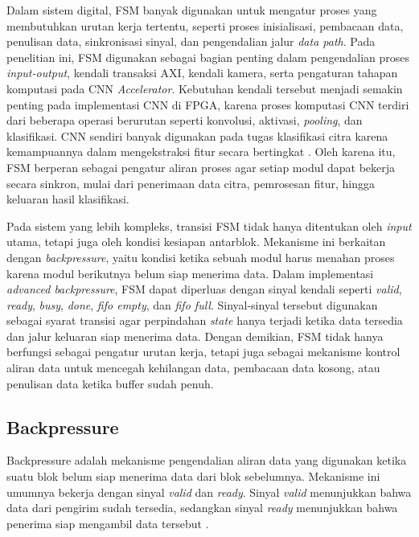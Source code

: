   Dalam sistem digital, FSM banyak digunakan untuk mengatur proses yang membutuhkan
  urutan kerja tertentu, seperti proses inisialisasi, pembacaan data, penulisan data,
  sinkronisasi sinyal, dan pengendalian jalur \emph{data path}. Pada penelitian ini, FSM
  digunakan sebagai bagian penting dalam pengendalian proses \emph{input-output}, kendali
  transaksi AXI, kendali kamera, serta pengaturan tahapan komputasi pada CNN
  \emph{Accelerator}. Kebutuhan kendali tersebut menjadi semakin penting pada implementasi
  CNN di FPGA, karena proses komputasi CNN terdiri dari beberapa operasi berurutan seperti
  konvolusi, aktivasi, \emph{pooling}, dan klasifikasi. CNN sendiri banyak digunakan pada
  tugas klasifikasi citra karena kemampuannya dalam mengekstraksi fitur secara bertingkat
  \cite{AlexNetPaper,Elharrouss2022BackbonesReviewFE}. Oleh karena itu, FSM berperan
  sebagai pengatur aliran proses agar setiap modul dapat bekerja secara sinkron, mulai
  dari penerimaan data citra, pemrosesan fitur, hingga keluaran hasil klasifikasi.

  Pada sistem yang lebih kompleks, transisi FSM tidak hanya ditentukan oleh \emph{input}
  utama, tetapi juga oleh kondisi kesiapan antarblok. Mekanisme ini berkaitan dengan
  \emph{backpressure}, yaitu kondisi ketika sebuah modul harus menahan proses karena modul
  berikutnya belum siap menerima data. Dalam implementasi \emph{advanced backpressure},
  FSM dapat diperluas dengan sinyal kendali seperti \emph{valid}, \emph{ready},
  \emph{busy}, \emph{done}, \emph{fifo empty}, dan \emph{fifo full}. Sinyal-sinyal
  tersebut digunakan sebagai syarat transisi agar perpindahan \emph{state} hanya terjadi
  ketika data tersedia dan jalur keluaran siap menerima data. Dengan demikian, FSM tidak
  hanya berfungsi sebagai pengatur urutan kerja, tetapi juga sebagai mekanisme kontrol
  aliran data untuk mencegah kehilangan data, pembacaan data kosong, atau penulisan data
  ketika buffer sudah penuh.

  \subsection{Backpressure}
  Backpressure adalah mekanisme pengendalian aliran data yang digunakan ketika
  suatu blok belum siap menerima data dari blok sebelumnya. Mekanisme ini umumnya
  bekerja dengan sinyal \emph{valid} dan \emph{ready}. Sinyal \emph{valid}
  menunjukkan bahwa data dari pengirim sudah tersedia, sedangkan sinyal \emph{ready}
  menunjukkan bahwa penerima siap mengambil data tersebut \cite{ARM2020AXI,ARM2020IntroAXI}.

